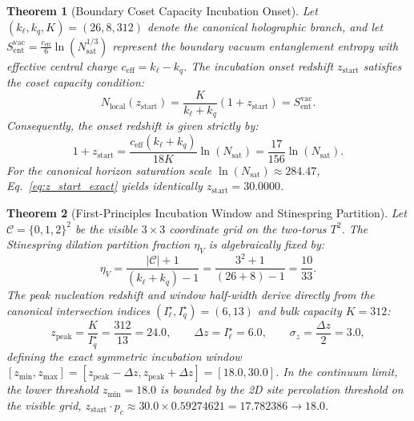 \documentclass[11pt,letterpaper]{article}
\theoremstyle{plain}
\newtheorem{theorem}{Theorem}
\begin{document}
\begin{theorem}[Boundary Coset Capacity Incubation Onset]
Let $(k_\ell, k_q, K) = (26, 8, 312)$ denote the canonical holographic branch, and let 
$S_{\mathrm{ent}}^{\mathrm{vac}} = \frac{c_{\mathrm{eff}}}{6} \ln\left(N_{\mathrm{sat}}^{1/3}\right)$ 
represent the boundary vacuum entanglement entropy with effective central charge $c_{\mathrm{eff}} = k_\ell - k_q$. 
The incubation onset redshift $z_{\mathrm{start}}$ satisfies the coset capacity condition:
\begin{equation}
    N_{\mathrm{local}}(z_{\mathrm{start}}) = \frac{K}{k_\ell + k_q}(1 + z_{\mathrm{start}}) = S_{\mathrm{ent}}^{\mathrm{vac}}.
\end{equation}
Consequently, the onset redshift is given strictly by:
\begin{equation}
    1 + z_{\mathrm{start}} = \frac{c_{\mathrm{eff}}(k_\ell + k_q)}{18 K} \ln(N_{\mathrm{sat}}) = \frac{17}{156} \ln(N_{\mathrm{sat}}).
    \label{eq:z_start_exact}
\end{equation}
For the canonical horizon saturation scale $\ln(N_{\mathrm{sat}}) \approx 284.47$, Eq.~\eqref{eq:z_start_exact} 
yields identically $z_{\mathrm{start}} = 30.0000$.
\end{theorem}

\begin{theorem}[First-Principles Incubation Window and Stinespring Partition]
Let $\mathcal{C} = \{0, 1, 2\}^2$ be the visible $3 \times 3$ coordinate grid on the two-torus $T^2$. 
The Stinespring dilation partition fraction $\eta_V$ is algebraically fixed by:
\begin{equation}
    \eta_V = \frac{|\mathcal{C}| + 1}{(k_\ell + k_q) - 1} = \frac{3^2 + 1}{(26 + 8) - 1} = \frac{10}{33}.
\end{equation}
The peak nucleation redshift and window half-width derive directly from the canonical intersection indices $(I_\ell^\star, I_q^\star) = (6, 13)$ and bulk capacity $K = 312$:
\begin{equation}
    z_{\mathrm{peak}} = \frac{K}{I_q^\star} = \frac{312}{13} = 24.0, \qquad \Delta z = I_\ell^\star = 6.0, \qquad \sigma_z = \frac{\Delta z}{2} = 3.0,
\end{equation}
defining the exact symmetric incubation window $[z_{\mathrm{min}}, z_{\mathrm{max}}] = [z_{\mathrm{peak}} - \Delta z, z_{\mathrm{peak}} + \Delta z] = [18.0, 30.0]$. In the continuum limit, the lower threshold $z_{\mathrm{min}} = 18.0$ is bounded by the 2D site percolation threshold on the visible grid, $z_{\mathrm{start}} \cdot p_c \approx 30.0 \times 0.59274621 = 17.782386 \to 18.0$.
\end{theorem}
\end{document}
